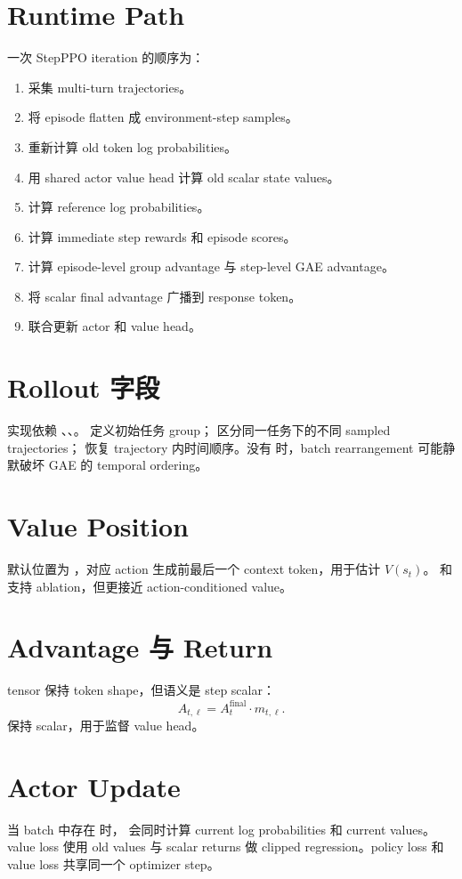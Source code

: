 \documentclass[10pt]{ctexart}
\begin{document}
\section*{Runtime Path}
一次 StepPPO iteration 的顺序为：
\begin{enumerate}
\item 采集 multi-turn trajectories。
\item 将 episode flatten 成 environment-step samples。
\item 重新计算 old token log probabilities。
\item 用 shared actor value head 计算 old scalar state values。
\item 计算 reference log probabilities。
\item 计算 immediate step rewards 和 episode scores。
\item 计算 episode-level group advantage 与 step-level GAE advantage。
\item 将 scalar final advantage 广播到 response token。
\item 联合更新 actor 和 value head。
\end{enumerate}

\section*{Rollout 字段}
实现依赖 、、。 定义初始任务 group； 区分同一任务下的不同 sampled trajectories； 恢复 trajectory 内时间顺序。没有  时，batch rearrangement 可能静默破坏 GAE 的 temporal ordering。

\section*{Value Position}
默认位置为 ，对应 action 生成前最后一个 context token，用于估计 $V(s_t)$。 和  支持 ablation，但更接近 action-conditioned value。

\section*{Advantage 与 Return}
 tensor 保持 token shape，但语义是 step scalar：
\[
A_{t,\ell}=A_t^{\mathrm{final}}\cdot m_{t,\ell}.
\]
 保持 scalar，用于监督 value head。

\section*{Actor Update}
当 batch 中存在  时， 会同时计算 current log probabilities 和 current values。value loss 使用 old values 与 scalar returns 做 clipped regression。policy loss 和 value loss 共享同一个 optimizer step。
\end{document}
